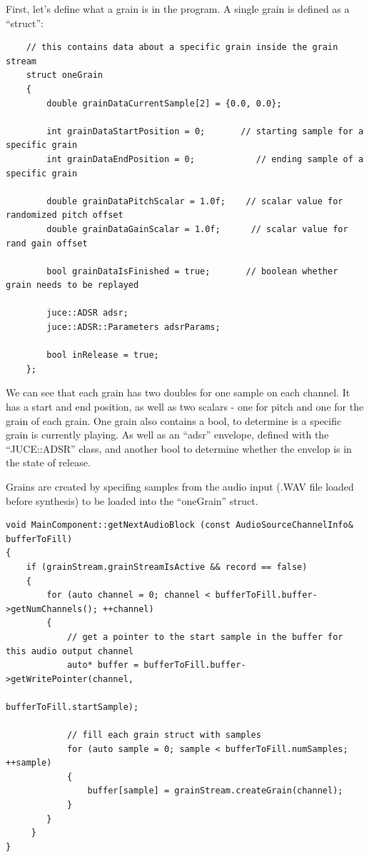 First, let's define what a grain is in the program. A single grain is
defined as a ``struct'':
\begin{lstlisting}
    // this contains data about a specific grain inside the grain stream
    struct oneGrain
    {
        double grainDataCurrentSample[2] = {0.0, 0.0};
        
        int grainDataStartPosition = 0;       // starting sample for a specific grain
        int grainDataEndPosition = 0;            // ending sample of a specific grain
        
        double grainDataPitchScalar = 1.0f;    // scalar value for randomized pitch offset
        double grainDataGainScalar = 1.0f;      // scalar value for rand gain offset
        
        bool grainDataIsFinished = true;       // boolean whether grain needs to be replayed
        
        juce::ADSR adsr;
        juce::ADSR::Parameters adsrParams;
        
        bool inRelease = true;
    };
\end{lstlisting}

We can see that each grain has two doubles for one sample on each
channel. It has a start and end position, as well as two scalars - one
for pitch and one for the grain of each grain. One grain also contains
a bool, to determine is a specific grain is currently playing. As well
as an ``adsr'' envelope, defined with the ``JUCE::ADSR'' class, and
another bool to determine whether the envelop is in the state of
release.

Grains are created by specifing samples from the audio input (.WAV
file loaded before synthesis) to be loaded into the ``oneGrain''
struct.
\begin{lstlisting}
void MainComponent::getNextAudioBlock (const AudioSourceChannelInfo& bufferToFill)
{
    if (grainStream.grainStreamIsActive && record == false)
    {
        for (auto channel = 0; channel < bufferToFill.buffer->getNumChannels(); ++channel)
        {
            // get a pointer to the start sample in the buffer for this audio output channel
            auto* buffer = bufferToFill.buffer->getWritePointer(channel,
                                                                      bufferToFill.startSample);

            // fill each grain struct with samples 
            for (auto sample = 0; sample < bufferToFill.numSamples; ++sample)
            {
                buffer[sample] = grainStream.createGrain(channel);
            }
        }
     }
}
\end{lstlisting}

